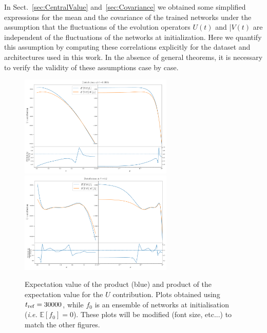 


In Sect.~\ref{sec:CentralValue} and~\ref{sec:Covariance} we obtained some simplified expressions 
for the mean and the covariance of the trained networks under the assumption that the fluctuations
of the evolution operators $U(t)$ and |$V(t)$ are independent of the fluctuations of the networks 
at initialization. Here we quantify this assumption by computing these correlations explicitly 
for the dataset and architectures used in this work. In the absence of general theorems, it is necessary 
to verify the validity of these assumptions case by case. 

\begin{figure}[t!]
  \label{fig:xT3_exp_val}
  \centering
  \includegraphics[width=0.65\textwidth]{plots/xT3_exp_val_early.pdf} \\
  \includegraphics[width=0.65\textwidth]{plots/xT3_exp_val_eot.pdf}
  \caption{Expectation value of the product (blue) and product of the
  expectation value for the $U$ contribution. Plots obtained using $t_{\rm ref}
  = 30000$, while $f_0$ is an ensemble of networks at initialisation
  (\textit{i.e.} $\mathbb{E}[f_0]=0$). \ac{These plots will be modified (font
  size, etc...) to match the other figures.}} 
\end{figure}

